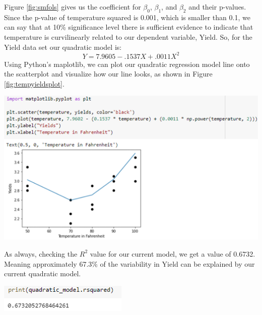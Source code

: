 \documentclass[a4paper,12pt]{report}
\begin{document}
Figure \ref{fig:smfols} gives us the coefficient for $\beta_0$, $\beta_1$, and $\beta_2$ and their p-values. Since the p-value of temperature squared is 0.001, which is smaller than 0.1, we can say that at 10\% significance level there is sufficient evidence to indicate that temperature is curvilinearly related to our dependent variable, Yield. So, for the Yield data set our quadratic model is:
$$Y=7.9605-.1537X+.0011X^2$$
Using Python’s maplotlib, we can plot our quadratic regression model line onto the scatterplot and visualize how our line looks, as shown in Figure \ref{fig:tempyieldsplot}. 

\begin{center}
    \captionsetup{type=figure}
    \includegraphics[width=.9\linewidth]{media/tempyieldsplot.png}
    \label{fig:tempyieldsplot}
\end{center}

As always, checking the $R^2$ value for our current model, we get a value of 0.6732. Meaning approximately 67.3\% of the variability in Yield can be explained by our current quadratic model. 

\begin{center}
    \captionsetup{type=figure}
    \includegraphics[width=.9\linewidth]{media/tempquadratic.png}
\end{center}
\end{document}
